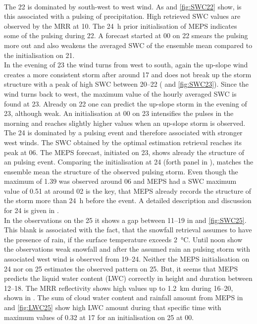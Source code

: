\\
The \SI{22}{\dec} is dominated by south-west to west wind. As  and \ref{fig:SWC22} show, is this associated with a pulsing of precipitation. High retrieved SWC values are observed by the MRR at \SI{10}{\UTC}. The \SI{24}{\hour} prior initialisation of MEPS indicates some of the pulsing during \SI{22}{\dec}. A forecast started at 0\SI{0}{\UTC} on \SI{22}{\dec} smears the pulsing more out and also weakens the averaged SWC of the ensemble mean compared to the initialisation on \SI{21}{\dec}. 
\\
In the evening of \SI{23}{\dec} the wind turns from west to south, again the up-slope wind creates a more consistent storm after around \SI{17}{\UTC} and does not break up the storm structure with a peak of high SWC between \SIrange{20}{22}{\UTC} ( and \ref{fig:SWC23}). Since the wind turns back to west, the maximum value of the hourly averaged SWC is found at \SI{23}{\UTC}. Already on \SI{22}{\dec} one can predict the up-slope storm in the evening of \SI{23}{\dec}, although weak. An initialisation at 0\SI{0}{\UTC} on \SI{23}{\dec} intensifies the pulses in the morning and reaches slightly higher values when an up-slope storm is observed.
\\
The \SI{24}{\dec} is dominated by a pulsing event and therefore associated with stronger west winds. The SWC obtained by the optimal estimation retrieval reaches its peak at 0\SI{6}{\UTC}. The MEPS forecast, initiated on \SI{23}{\dec}, shows already the structure of an pulsing event. Comparing the initialisation at \SI{24}{\dec} (forth panel in ), matches the ensemble mean the structure of the observed pulsing storm. Even though the maximum of \SI{1.39}{\SWC} was observed around 0\SI{6}{\UTC} and MEPS had a SWC maximum value of \SI{0.51}{\SWC} at around 0\SI{2}{\UTC} is the key, that MEPS already records the structure of the storm more than \SI{24}{\hour} before the event. A detailed description and discussion for \SI{24}{\dec} is given in .
\\
In the observations on the \SI{25}{\dec} it shows a gap between \SIrange{11}{19}{\UTC} in  and \ref{fig:SWC25}. This blank is associated with the fact, that the snowfall retrieval assumes to have the presence of rain, if the surface temperature exceeds \SI{2}{\celsius}. Until noon show the observations weak snowfall and after the assumed rain an pulsing storm with associated west wind is observed from \SIrange{19}{24}{\UTC}. Neither the MEPS initialisation on \SI{24}{\dec} nor on \SI{25}{\dec} estimates the observed pattern on \SI{25}{\dec}. But, it seems that MEPS predicts the liquid water content (LWC) correctly in height and duration between \SIrange{12}{18}{\UTC}. The MRR reflectivity shows high values up to  \SI{1.2}{\kilo\metre} during \SIrange{16}{20}{\UTC}, shown in . The sum of cloud water content and rainfall amount from MEPS in  and \ref{fig:LWC25} show high LWC amount during that specific time with maximum values of \SI{0.32}{\SWC} at \SI{17}{\UTC} for an initialisation on \SI{25}{\dec} at 0\SI{0}{\UTC}.
